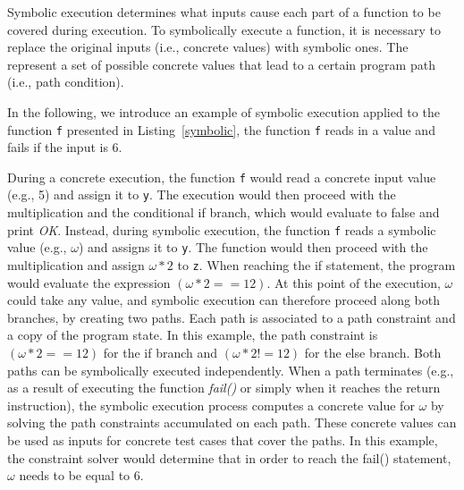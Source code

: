 
Symbolic execution determines what inputs cause each part of a function to be covered during execution. To symbolically execute a function, it is necessary to replace the original inputs (i.e., concrete values) with symbolic ones. The  represent a set of possible concrete values that lead to a certain program path (i.e., path condition). 

In the following, we introduce an example of symbolic execution applied to the function \texttt{f} presented in Listing~\ref{symbolic}, the function \texttt{f} reads in a value and fails if the input is 6.



During a concrete execution, the function \texttt{f} would read a concrete input value (e.g., 5) and assign it to \texttt{y}. The execution would then proceed with the multiplication and the conditional if branch, which would evaluate to false and print \emph{OK}.
Instead, during symbolic execution, the function \texttt{f} reads a symbolic value (e.g., $\omega$) and assigns it to \texttt{y}. The function would then proceed with the multiplication and assign $\omega * 2$ to \texttt{z}. When reaching the if statement, the program would evaluate the expression $(\omega * 2 == 12)$. 
At this point of the execution, $\omega$ could take any value, and symbolic execution can therefore proceed along both branches, by creating two paths. 
Each path is associated to a path constraint and a copy of the program state.
In this example, the path constraint is $(\omega * 2 == 12)$ for the if branch and $(\omega * 2 != 12)$ for the else branch. 
Both paths can be symbolically executed independently. When a path terminates (e.g., as a result of executing the function \emph{fail()} or simply when it reaches the return instruction), the symbolic execution process computes a concrete value for $\omega$ by solving the path constraints accumulated on each path. 
These concrete values can be used as inputs for concrete test cases that cover the paths. In this example, the constraint solver would determine that in order to reach the fail() statement, $\omega$ needs to be equal to 6.

